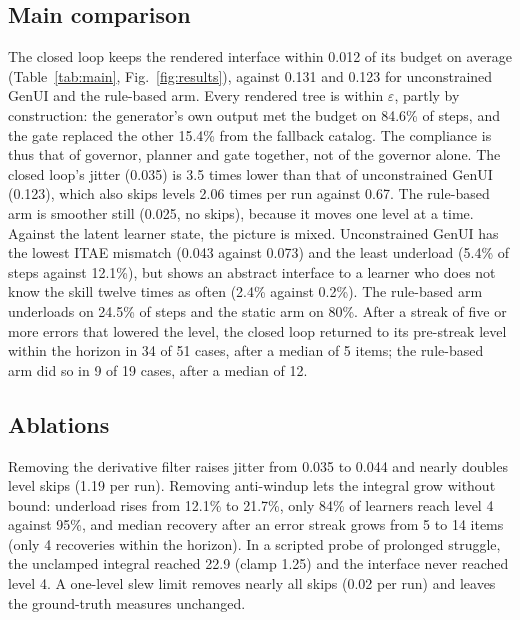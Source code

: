 \documentclass[conference]{IEEEtran}
\begin{document}
\subsection{Main comparison}
The closed loop keeps the rendered interface within 0.012 of its budget
on average (Table~\ref{tab:main}, Fig.~\ref{fig:results}), against 0.131
and 0.123 for unconstrained GenUI and the rule-based arm. Every rendered tree
is within $\varepsilon$, partly by construction: the generator's own output met
the budget on 84.6\% of steps, and the gate replaced the other 15.4\% from the
fallback catalog. The compliance is thus that of governor, planner and gate
together, not of the governor alone. The closed loop's jitter (0.035) is 3.5 times lower than that of
unconstrained GenUI (0.123), which also skips levels 2.06 times per run
against 0.67. The rule-based arm is smoother still (0.025, no skips), because
it moves one level at a time. Against the latent learner state, the picture
is mixed. Unconstrained GenUI has the lowest ITAE mismatch (0.043 against
0.073) and the least underload (5.4\% of steps against 12.1\%), but shows an
abstract interface to a learner who does not know the skill twelve times as
often (2.4\% against 0.2\%). The rule-based arm underloads on 24.5\% of steps
and the static arm on 80\%. After a streak of five or more errors that lowered the level, the
closed loop returned to its pre-streak level within the horizon in 34 of
51 cases, after a median of 5 items; the rule-based arm did so in 9 of
19 cases, after a median of 12.

\subsection{Ablations}
Removing the derivative filter raises jitter from 0.035 to 0.044 and nearly
doubles level skips (1.19 per run). Removing anti-windup lets the integral
grow without bound: underload rises from 12.1\% to 21.7\%, only 84\% of
learners reach level 4 against 95\%, and median recovery after an error
streak grows from 5 to 14 items (only 4 recoveries within the horizon). In a scripted probe of prolonged struggle,
the unclamped integral reached 22.9 (clamp 1.25) and the interface never
reached level 4. A one-level slew limit removes nearly all skips (0.02 per
run) and leaves the ground-truth measures unchanged.
\end{document}
